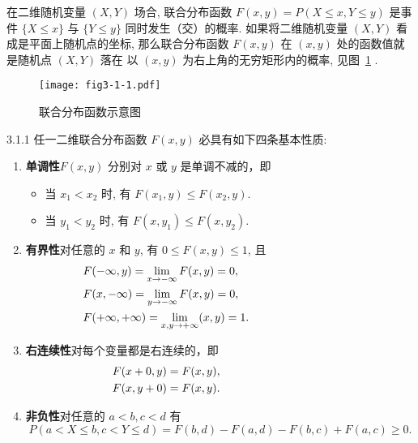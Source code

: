    在二维随机变量 $(X,Y)$ 场合, 联合分布函数 $F(x,y)=P(X\leq x,Y\leq y)$ 是事件 $\{X\leq x\}$ 与 $\{Y \leq y\}$ 同时发生（交）的概率. 
   如果将二维随机变量 $(X,Y)$ 看成是平面上随机点的坐标, 那么联合分布函数 $F(x,y)$ 在 $(x,y)$ 处的函数值就是随机点 $(X, Y)$ 落在
   以 $(x,y)$ 为右上角的无穷矩形内的概率, 见图~\ref{fig:3.1.1} .
   \begin{figure}[htbp]
   	\centering
   	\texttt{[image: fig3-1-1.pdf]}
   	\caption{联合分布函数示意图}\label{fig:3.1.1}
   \end{figure}
   \begin{theorem}{}{3.1.1}
   	任一二维联合分布函数 $F(x,y)$ 必具有如下四条基本性质: 
    \begin{enumerate}
    	\item \textbf{单调性}\quad $F(x,y)$ 分别对 $x$ 或 $y$ 是单调不减的，即
    	\begin{itemize}
    		\item 当 $x_1<x_2$ 时, 有 $F(x_1,y)\leq F(x_2,y)$.
    		\item 当 $y_1<y_2$ 时, 有 $F(x,y_1)\leq F(x,y_2)$. 
    	\end{itemize}
    	\item \textbf{有界性}\quad 对任意的 $x$ 和 $y$, 有 $0\leq F(x,y) \leq 1$, 且
    	\begin{align*}
    		&F(-\infty,y)=\lim_{x\to -\infty}F(x,y)=0,	&\hspace*{3cm} \\
    		&F(x,-\infty)=\lim_{y\to -\infty}F(x,y)=0,	&\\
    		&F(+\infty,+\infty)=\lim_{x,y\to +\infty}(x,y)=1.&
    	\end{align*}
    	\item \textbf{右连续性}\quad  对每个变量都是右连续的，即
    		\begin{align*} 
    			F(x+0, y) &=F(x, y), &\hspace*{3cm} \\ 
    			F(x, y+0) &=F(x, y). &
    		\end{align*}
    	\item \textbf{非负性}\quad 对任意的 $a<b,c<d$ 有
    		\begin{equation*}
    		 	P(a<X \leq b, c<Y \leq d)= F(b, d)-F(a, d)-F(b, c)+ F(a, c) \geq 0 .
    		\end{equation*}
    \end{enumerate}
   \end{theorem}
